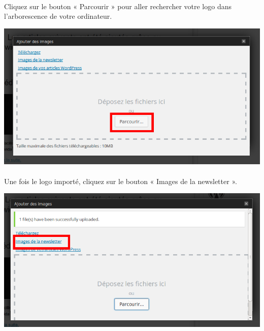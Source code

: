 \documentclass[10pt,a4paper]{article}
\begin{document}
\paragraph{}Cliquez sur le bouton « Parcourir » pour aller rechercher votre logo dans l'arborescence de votre ordinateur.
\begin{center}
\includegraphics[scale=0.3]{img/0219.png}
\end{center}
\paragraph{}Une fois le logo importé, cliquez sur le bouton « Images de la newsletter ».
\begin{center}
\includegraphics[scale=0.3]{img/0220.png}
\end{center}
\end{document}
